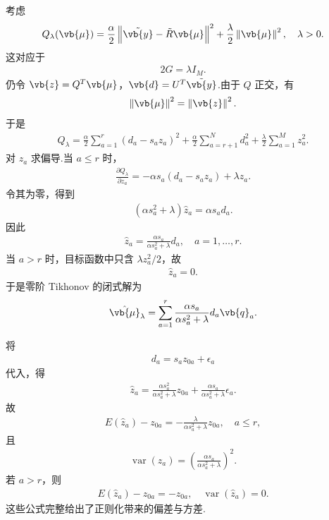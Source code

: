 考虑
\begin{align*}
	Q_\lambda(\vb{\mu})
	=\frac{\alpha}{2}\left\|\tilde{\vb{y}}-\tilde{R}\vb{\mu}\right\|^2
	+\frac{\lambda}{2}\left\|\vb{\mu}\right\|^2,
	\quad \lambda>0.
\end{align*}
这对应于
\begin{align*}
	2G=\lambda I_M.
\end{align*}
仍令 \(\vb{z}=Q^T\vb{\mu}\)，\(\vb{d}=U^T\tilde{\vb{y}}\).由于 \(Q\) 正交，有
\begin{align*}
	\left\|\vb{\mu}\right\|^2
	=\left\|\vb{z}\right\|^2.
\end{align*}
于是
\begin{align*}
	Q_\lambda
	=\frac{\alpha}{2}\sum_{a=1}^{r}(d_a-s_az_a)^2
	+\frac{\alpha}{2}\sum_{a=r+1}^{N}d_a^2
	+\frac{\lambda}{2}\sum_{a=1}^{M}z_a^2.
\end{align*}
对 \(z_a\) 求偏导.当 \(a\leq r\) 时，
\begin{align*}
	\frac{\partial Q_\lambda}{\partial z_a}
	=-\alpha s_a(d_a-s_az_a)+\lambda z_a.
\end{align*}
令其为零，得到
\begin{align*}
	(\alpha s_a^2+\lambda)\hat{z}_a
	=\alpha s_ad_a.
\end{align*}
因此
\begin{align*}
	\hat{z}_a
	=\frac{\alpha s_a}{\alpha s_a^2+\lambda}d_a,
	\quad a=1,\ldots,r.
\end{align*}
当 \(a>r\) 时，目标函数中只含 \(\lambda z_a^2/2\)，故
\begin{align*}
	\hat{z}_a=0.
\end{align*}
于是零阶 Tikhonov 的闭式解为
\begin{align*}
	\hat{\vb{\mu}}_\lambda
	=\sum_{a=1}^{r}
	\frac{\alpha s_a}{\alpha s_a^2+\lambda}
	d_a\vb{q}_a.
\end{align*}

将
\begin{align*}
	d_a=s_az_{0a}+\epsilon_a
\end{align*}
代入，得
\begin{align*}
	\hat{z}_a
	=\frac{\alpha s_a^2}{\alpha s_a^2+\lambda}z_{0a}
	+\frac{\alpha s_a}{\alpha s_a^2+\lambda}\epsilon_a.
\end{align*}
故
\begin{align*}
	E(\hat{z}_a)-z_{0a}
	=-\frac{\lambda}{\alpha s_a^2+\lambda}z_{0a},
	\quad a\leq r,
\end{align*}
且
\begin{align*}
	\operatorname{var}(\hat{z}_a)
	=\left(\frac{\alpha s_a}{\alpha s_a^2+\lambda}\right)^2.
\end{align*}
若 \(a>r\)，则
\begin{align*}
	E(\hat{z}_a)-z_{0a}=-z_{0a},\quad
	\operatorname{var}(\hat{z}_a)=0.
\end{align*}
这些公式完整给出了正则化带来的偏差与方差.

